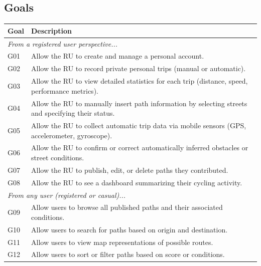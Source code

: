 \subsection{Goals}
\label{subsec:goals}%
\begin{longtable}{|l|p{}|}
    \hline
    \textbf{Goal} & \textbf{Description} \\
    \hline \hline

    \multicolumn{2}{|l|}{\textit{From a registered user perspective...}} \\
    \hline
    G01 & Allow the RU to create and manage a personal account. \\
    \hline
    G02 & Allow the RU to record private personal trips (manual or automatic). \\
    \hline
    G03 & Allow the RU to view detailed statistics for each trip (distance, speed, performance metrics). \\
    \hline
    G04 & Allow the RU to manually insert path information by selecting streets and specifying their status. \\
    \hline
    G05 & Allow the RU to collect automatic trip data via mobile sensors (GPS, accelerometer, gyroscope). \\
    \hline
    G06 & Allow the RU to confirm or correct automatically inferred obstacles or street conditions. \\
    \hline
    G07 & Allow the RU to publish, edit, or delete paths they contributed. \\
    \hline
    G08 & Allow the RU to see a dashboard summarizing their cycling activity. \\
    \hline

    \multicolumn{2}{|l|}{\textit{From any user (registered or casual)...}} \\
    \hline
    G09 & Allow users to browse all published paths and their associated conditions. \\
    \hline
    G10 & Allow users to search for paths based on origin and destination. \\
    \hline
    G11 & Allow users to view map representations of possible routes. \\
    \hline
    G12 & Allow users to sort or filter paths based on score or conditions. \\
    \hline


\end{longtable}
